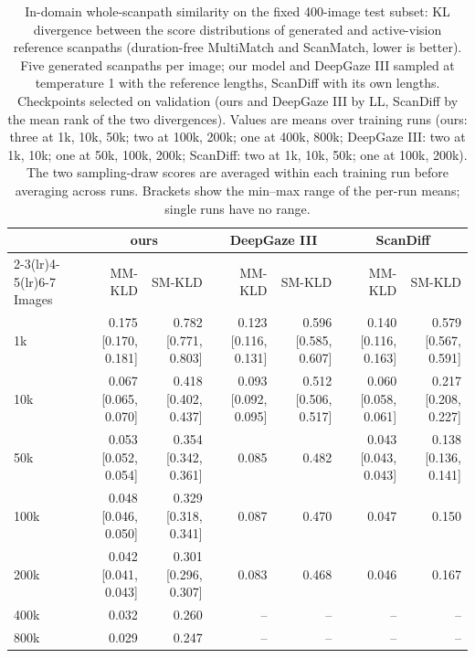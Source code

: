 \begin{table}[t]
  \centering
  \small
  \begin{tabular}{lrrrrrr}
    \toprule
    & \multicolumn{2}{c}{ours} & \multicolumn{2}{c}{DeepGaze III} & \multicolumn{2}{c}{ScanDiff} \\
    \cmidrule(lr){2-3}\cmidrule(lr){4-5}\cmidrule(lr){6-7}
    Images & MM-KLD & SM-KLD & MM-KLD & SM-KLD & MM-KLD & SM-KLD \\
    \midrule
    1k & 0.175 \scriptsize[0.170, 0.181] & 0.782 \scriptsize[0.771, 0.803] & 0.123 \scriptsize[0.116, 0.131] & 0.596 \scriptsize[0.585, 0.607] & 0.140 \scriptsize[0.116, 0.163] & 0.579 \scriptsize[0.567, 0.591] \\
    10k & 0.067 \scriptsize[0.065, 0.070] & 0.418 \scriptsize[0.402, 0.437] & 0.093 \scriptsize[0.092, 0.095] & 0.512 \scriptsize[0.506, 0.517] & 0.060 \scriptsize[0.058, 0.061] & 0.217 \scriptsize[0.208, 0.227] \\
    50k & 0.053 \scriptsize[0.052, 0.054] & 0.354 \scriptsize[0.342, 0.361] & 0.085 & 0.482 & 0.043 \scriptsize[0.043, 0.043] & 0.138 \scriptsize[0.136, 0.141] \\
    100k & 0.048 \scriptsize[0.046, 0.050] & 0.329 \scriptsize[0.318, 0.341] & 0.087 & 0.470 & 0.047 & 0.150 \\
    200k & 0.042 \scriptsize[0.041, 0.043] & 0.301 \scriptsize[0.296, 0.307] & 0.083 & 0.468 & 0.046 & 0.167 \\
    400k & 0.032 & 0.260 & -- & -- & -- & -- \\
    800k & 0.029 & 0.247 & -- & -- & -- & -- \\
    \bottomrule
  \end{tabular}
  \caption{In-domain whole-scanpath similarity on the fixed 400-image test subset: KL divergence between the score distributions of generated and active-vision reference scanpaths (duration-free MultiMatch and ScanMatch, lower is better). Five generated scanpaths per image; our model and DeepGaze III sampled at temperature 1 with the reference lengths, ScanDiff with its own lengths. Checkpoints selected on validation (ours and DeepGaze III by LL, ScanDiff by the mean rank of the two divergences). Values are means over training runs (ours: three at 1k, 10k, 50k; two at 100k, 200k; one at 400k, 800k; DeepGaze III: two at 1k, 10k; one at 50k, 100k, 200k; ScanDiff: two at 1k, 10k, 50k; one at 100k, 200k). The two sampling-draw scores are averaged within each training run before averaging across runs. Brackets show the min--max range of the per-run means; single runs have no range.}
  \label{tab:realism}
\end{table}

